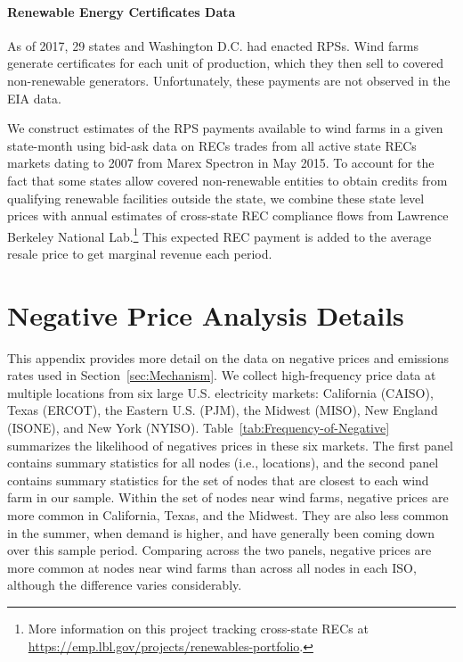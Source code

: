 \documentclass[12pt]{article}
\begin{document}
\paragraph*{Renewable Energy Certificates Data}

As of 2017, 29 states and Washington D.C. had enacted RPSs. Wind farms generate certificates for each unit of production, which they then sell to covered non-renewable generators. Unfortunately, these payments are not observed in the EIA data.

We construct estimates of the RPS payments available to wind farms in a given state-month using bid-ask data on RECs trades from all active state RECs markets dating to 2007 from Marex Spectron in May 2015. To account for the fact that some states allow covered non-renewable entities to obtain credits from qualifying renewable facilities outside the state, we combine these state level prices with annual estimates of cross-state REC compliance flows from Lawrence Berkeley National Lab.\footnote{More information on this project tracking cross-state RECs at \href{https://emp.lbl.gov/projects/renewables-portfolio}{https://emp.lbl.gov/projects/renewables-portfolio}.} This expected REC payment is added to the average resale price to get marginal revenue each period. 





\clearpage
\section{Negative Price Analysis Details \label{Appendix:NegativePrices}}
\setcounter{figure}{0}  \renewcommand{\thefigure}{C.\arabic{figure}} 
\setcounter{table}{0}  \renewcommand{\thetable}{C.\arabic{table}} 

This appendix provides more detail on the data on negative prices and emissions rates used in Section~\ref{sec:Mechanism}. We collect high-frequency price data at multiple locations from six large U.S. electricity markets: California (CAISO), Texas (ERCOT), the Eastern U.S. (PJM), the Midwest (MISO), New England (ISONE), and New York (NYISO). Table~\ref{tab:Frequency-of-Negative} summarizes the likelihood of negatives prices in these six markets. The first panel contains summary statistics for all nodes (i.e., locations), and the second panel contains summary statistics for the set of nodes that are closest to each wind farm in our sample. Within the set of nodes near wind farms, negative prices are more common in California, Texas, and the Midwest. They are also less common in the summer, when demand is higher, and have generally been coming down over this sample period. Comparing across the two panels, negative prices are more common at nodes near wind farms than across all nodes in each ISO, although the difference varies considerably.
\end{document}

